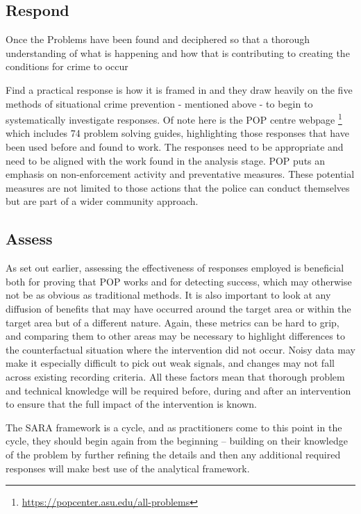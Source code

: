 \subsection{Respond} Once the Problems have been found and deciphered so that a thorough understanding of what is happening and how that is contributing to creating the conditions for crime to occur


Find a practical response is how it is framed in   and they draw heavily on the five methods of situational crime prevention - mentioned  above - to begin to systematically investigate responses.  Of note here is the POP centre webpage \footnote{ \url{https://popcenter.asu.edu/all-problems} } which includes 74 problem solving guides, highlighting those responses that have been used before and found to work. The responses need to be appropriate and need to be aligned with the work found in the analysis stage. POP puts an emphasis on non-enforcement activity and preventative measures. These potential measures are not limited to those actions that the police can conduct themselves but are part of a wider community approach.

\subsection{Assess} As set out earlier, assessing the effectiveness of responses employed is beneficial both for proving that POP works and for detecting success, which may otherwise not be as obvious as traditional methods. It is also important to look at any diffusion of benefits that may have occurred around the target area or within the target area but of a different nature. Again, these metrics can be hard to grip, and comparing them to other areas may be necessary to highlight differences to the counterfactual situation where the intervention did not occur. Noisy data may make it especially difficult to pick out weak signals, and changes may not fall across existing recording criteria. All these factors mean that thorough problem and technical knowledge will be required before, during and after an intervention to ensure that the full impact of the intervention is known.

The SARA framework is a cycle, and as practitioners come to this point in the cycle, they should begin again from the beginning – building on their knowledge of the problem by further refining the details and then any additional required responses will make best use of the analytical framework.


